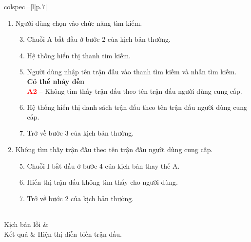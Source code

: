 \begin{longtblr}[caption = {Đặc tả usecase Xem diễn biến trận đấu loại},
  label = {tab:usecase11-spec},]{colspec={|l|p{.7\linewidth}|}}
\begin{minipage}{\linewidth}
    \vskip 4pt
    \begin{enumerate}[label={\textbf{\textcolor{red}{A\arabic*}} --}, align=left, itemsep=-5pt]
      \item Người dùng chọn vào chức năng tìm kiếm. \\
            \vspace{-1.5em}
            \begin{enumerate}[leftmargin=-5px, align=left, label=\arabic*.]
              \setcounter{enumii}{2}
              \item[]
                    \hspace{-25px} Chuỗi A bắt đầu ở bước 2 của kịch bản thường.
              \item Hệ thống hiển thị thanh tìm kiếm.
              \item Người dùng nhập tên trận đấu vào thanh tìm kiếm và nhấn tìm kiếm.\\
                    \textbf{Có thể nhảy đến}\\
                    \textbf{\textcolor{red}{A2}} -- Không tìm thấy trận đấu theo tên trận đấu người dùng cung cấp.
              \item Hệ thống hiển thị danh sách trận đấu theo tên trận đấu người dùng cung cấp.
              \item[]
                    \hspace{-25px} Trở về bước 3 của kịch bản thường.
            \end{enumerate}

      \item Không tìm thấy trận đấu theo tên trận đấu người dùng cung cấp. \\
            \vspace{-1.5em}
            \begin{enumerate}[leftmargin=-5px, align=left, label=\arabic*.]
              \setcounter{enumii}{4}
              \item[]
                    \hspace{-25px} Chuỗi I bắt đầu ở bước 4 của kịch bản thay thế A.
              \item Hiển thị trận đấu không tìm thấy cho người dùng.
              \item[]
                    \hspace{-25px} Trở về bước 2 của kịch bản thường.
            \end{enumerate}
    \end{enumerate}
    \vskip 1pt

  \end{minipage}
  \\\hline
  Kịch bản lỗi         &                                                         \\\hline
  Kết quả              & Hiện thị diễn biến trận đấu.                            \\\hline
\end{longtblr}
